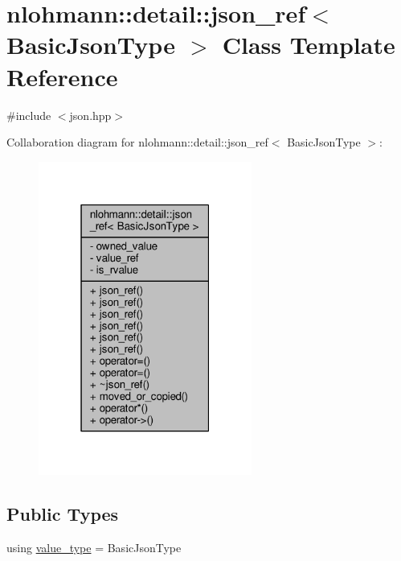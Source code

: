 \hypertarget{classnlohmann_1_1detail_1_1json__ref}{}\section{nlohmann\+:\+:detail\+:\+:json\+\_\+ref$<$ Basic\+Json\+Type $>$ Class Template Reference}
\label{classnlohmann_1_1detail_1_1json__ref}


{\ttfamily \#include $<$json.\+hpp$>$}



Collaboration diagram for nlohmann\+:\+:detail\+:\+:json\+\_\+ref$<$ Basic\+Json\+Type $>$\+:
\nopagebreak
\begin{figure}[H]
\begin{center}
\leavevmode
\includegraphics[width=199pt]{classnlohmann_1_1detail_1_1json__ref__coll__graph}
\end{center}
\end{figure}
\subsection*{Public Types}
\begin{DoxyCompactItemize}
\item 
using \hyperlink{classnlohmann_1_1detail_1_1json__ref_a78d76cf288141049568c0d670ed670ef}{value\+\_\+type} = Basic\+Json\+Type
\end{DoxyCompactItemize}
